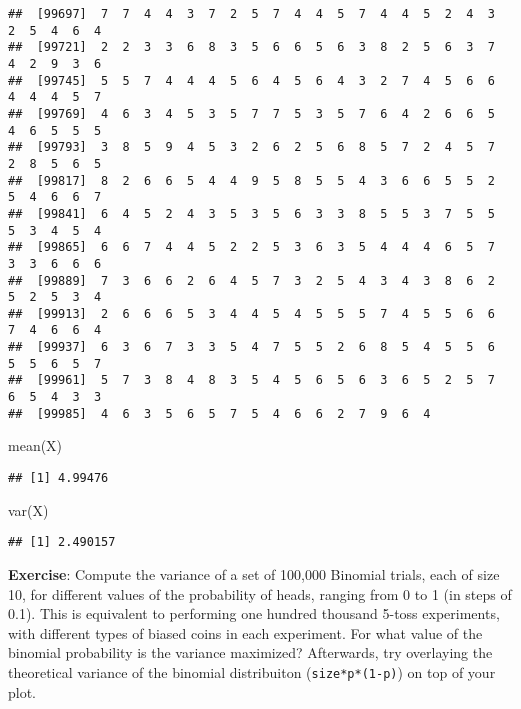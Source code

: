 \documentclass[
]{book}
\newenvironment{Shaded}{\begin{snugshade}}{\end{snugshade}}
\newcommand{\FunctionTok}[1]{\textcolor[rgb]{0.00,0.00,0.00}{#1}}
\newcommand{\NormalTok}[1]{#1}
\begin{document}
\begin{verbatim}
##  [99697]  7  7  4  4  3  7  2  5  7  4  4  5  7  4  4  5  2  4  3  2  5  4  6  4
##  [99721]  2  2  3  3  6  8  3  5  6  6  5  6  3  8  2  5  6  3  7  4  2  9  3  6
##  [99745]  5  5  7  4  4  4  5  6  4  5  6  4  3  2  7  4  5  6  6  4  4  4  5  7
##  [99769]  4  6  3  4  5  3  5  7  7  5  3  5  7  6  4  2  6  6  5  4  6  5  5  5
##  [99793]  3  8  5  9  4  5  3  2  6  2  5  6  8  5  7  2  4  5  7  2  8  5  6  5
##  [99817]  8  2  6  6  5  4  4  9  5  8  5  5  4  3  6  6  5  5  2  5  4  6  6  7
##  [99841]  6  4  5  2  4  3  5  3  5  6  3  3  8  5  5  3  7  5  5  5  3  4  5  4
##  [99865]  6  6  7  4  4  5  2  2  5  3  6  3  5  4  4  4  6  5  7  3  3  6  6  6
##  [99889]  7  3  6  6  2  6  4  5  7  3  2  5  4  3  4  3  8  6  2  5  2  5  3  4
##  [99913]  2  6  6  6  5  3  4  4  5  4  5  5  5  7  4  5  5  6  6  7  4  6  6  4
##  [99937]  6  3  6  7  3  3  5  4  7  5  5  2  6  8  5  4  5  5  6  5  5  6  5  7
##  [99961]  5  7  3  8  4  8  3  5  4  5  6  5  6  3  6  5  2  5  7  6  5  4  3  3
##  [99985]  4  6  3  5  6  5  7  5  4  6  6  2  7  9  6  4
\end{verbatim}

\begin{Shaded}
\begin{Highlighting}[]
\FunctionTok{mean}\NormalTok{(X)}
\end{Highlighting}
\end{Shaded}

\begin{verbatim}
## [1] 4.99476
\end{verbatim}

\begin{Shaded}
\begin{Highlighting}[]
\FunctionTok{var}\NormalTok{(X)}
\end{Highlighting}
\end{Shaded}

\begin{verbatim}
## [1] 2.490157
\end{verbatim}

\textbf{Exercise}: Compute the variance of a set of 100,000 Binomial trials, each of size 10, for different values of the probability of heads, ranging from 0 to 1 (in steps of 0.1). This is equivalent to performing one hundred thousand 5-toss experiments, with different types of biased coins in each experiment. For what value of the binomial probability is the variance maximized? Afterwards, try overlaying the theoretical variance of the binomial distribuiton (\texttt{size*p*(1-p)}) on top of your plot.
\end{document}
